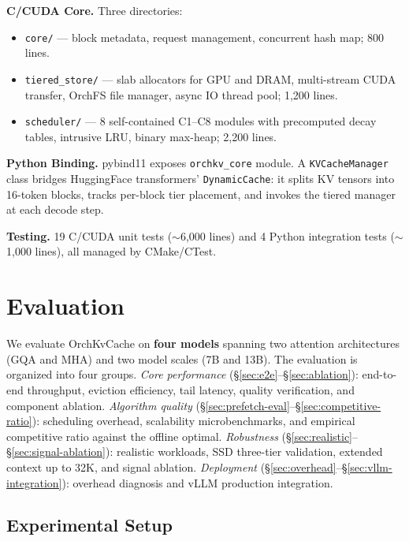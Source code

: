 \documentclass[conference]{IEEEtran}
\begin{document}
\textbf{C/CUDA Core.} Three directories:
\begin{itemize}
\item \texttt{core/} --- block metadata, request management, concurrent hash map; 800 lines.
\item \texttt{tiered\_store/} --- slab allocators for GPU and DRAM, multi-stream CUDA transfer, OrchFS file manager, async IO thread pool; 1,200 lines.
\item \texttt{scheduler/} --- 8 self-contained C1--C8 modules with precomputed decay tables, intrusive LRU, binary max-heap; 2,200 lines.
\end{itemize}

\textbf{Python Binding.} pybind11 exposes \texttt{orchkv\_core} module. A \texttt{KVCacheManager} class bridges HuggingFace transformers' \texttt{DynamicCache}: it splits KV tensors into 16-token blocks, tracks per-block tier placement, and invokes the tiered manager at each decode step.

\textbf{Testing.} 19 C/CUDA unit tests (${\sim}$6,000 lines) and 4 Python integration tests (${\sim}$1,000 lines), all managed by CMake/CTest.

\section{Evaluation}

We evaluate OrchKvCache on \textbf{four models} spanning two attention architectures (GQA and MHA) and two model scales (7B and 13B). The evaluation is organized into four groups. \emph{Core performance} (\S\ref{sec:e2e}--\S\ref{sec:ablation}): end-to-end throughput, eviction efficiency, tail latency, quality verification, and component ablation. \emph{Algorithm quality} (\S\ref{sec:prefetch-eval}--\S\ref{sec:competitive-ratio}): scheduling overhead, scalability microbenchmarks, and empirical competitive ratio against the offline optimal. \emph{Robustness} (\S\ref{sec:realistic}--\S\ref{sec:signal-ablation}): realistic workloads, SSD three-tier validation, extended context up to 32K, and signal ablation. \emph{Deployment} (\S\ref{sec:overhead}--\S\ref{sec:vllm-integration}): overhead diagnosis and vLLM production integration.

\subsection{Experimental Setup}
\end{document}
